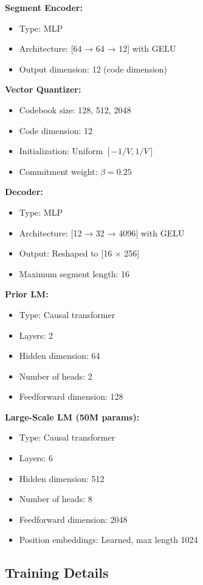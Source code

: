 \documentclass{article}
\begin{document}
\textbf{Segment Encoder:}
\begin{itemize}
    \item Type: MLP
    \item Architecture: [64 → 64 → 12] with GELU
    \item Output dimension: 12 (code dimension)
\end{itemize}

\textbf{Vector Quantizer:}
\begin{itemize}
    \item Codebook size: {128, 512, 2048}
    \item Code dimension: 12
    \item Initialization: Uniform $[-1/V, 1/V]$
    \item Commitment weight: $\beta = 0.25$
\end{itemize}

\textbf{Decoder:}
\begin{itemize}
    \item Type: MLP
    \item Architecture: [12 → 32 → 4096] with GELU
    \item Output: Reshaped to [16 × 256]
    \item Maximum segment length: 16
\end{itemize}

\textbf{Prior LM:}
\begin{itemize}
    \item Type: Causal transformer
    \item Layers: 2
    \item Hidden dimension: 64
    \item Number of heads: 2
    \item Feedforward dimension: 128
\end{itemize}

\textbf{Large-Scale LM (50M params):}
\begin{itemize}
    \item Type: Causal transformer
    \item Layers: 6
    \item Hidden dimension: 512
    \item Number of heads: 8
    \item Feedforward dimension: 2048
    \item Position embeddings: Learned, max length 1024
\end{itemize}

\subsection{Training Details}
\end{document}
